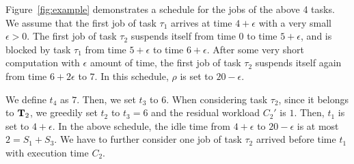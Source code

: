 Figure~\ref{fig:example} demonstrates a schedule for the jobs of the
above 4 tasks. We assume that the first job of task $\tau_1$ arrives
at time $4+\epsilon$ with a very small $\epsilon > 0$. The first job
of task $\tau_2$ suspends itself from time $0$ to time $5+\epsilon$,
and is blocked by task $\tau_1$ from time $5+\epsilon$ to time
$6+\epsilon$. After some very short computation with $\epsilon$ amount
of time, the first job of task $\tau_2$ suspends itself again from
time $6+2\epsilon$ to $7$.   In this schedule, $\rho$ is set to $20-\epsilon$.

We define $t_4$ as $7$. Then, we set $t_3$ to $6$. When considering
task $\tau_2$, since it belongs to ${\bf T}_2$, we greedily set $t_2$
to $t_3=6$ and the residual workload $C_2'$ is $1$. Then, $t_1$ is set
to $4+\epsilon$. In the above schedule, the idle time from
$4+\epsilon$ to $20-\epsilon$ is at most $2 = S_1+S_3$. We have to
further consider one job of task $\tau_2$ arrived before time $t_1$
with execution time $C_2$.
  
  
  

